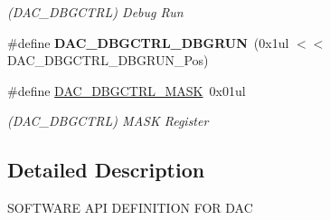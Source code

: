 \begin{DoxyCompactItemize}
\begin{DoxyCompactList}\small\item\em (D\+A\+C\+\_\+\+D\+B\+G\+C\+T\+R\+L) Debug Run \end{DoxyCompactList}\item 
\hypertarget{group___s_a_m_l21___d_a_c_gad4d5fee7dbfc084260f641e79641a97e}{}\#define {\bfseries D\+A\+C\+\_\+\+D\+B\+G\+C\+T\+R\+L\+\_\+\+D\+B\+G\+R\+U\+N}~(0x1ul $<$$<$ D\+A\+C\+\_\+\+D\+B\+G\+C\+T\+R\+L\+\_\+\+D\+B\+G\+R\+U\+N\+\_\+\+Pos)\label{group___s_a_m_l21___d_a_c_gad4d5fee7dbfc084260f641e79641a97e}

\item 
\hypertarget{group___s_a_m_l21___d_a_c_gaf587f004b2e652bebe2c8d2443acf5bd}{}\#define \hyperlink{group___s_a_m_l21___d_a_c_gaf587f004b2e652bebe2c8d2443acf5bd}{D\+A\+C\+\_\+\+D\+B\+G\+C\+T\+R\+L\+\_\+\+M\+A\+S\+K}~0x01ul\label{group___s_a_m_l21___d_a_c_gaf587f004b2e652bebe2c8d2443acf5bd}

\begin{DoxyCompactList}\small\item\em (D\+A\+C\+\_\+\+D\+B\+G\+C\+T\+R\+L) M\+A\+S\+K Register \end{DoxyCompactList}\end{DoxyCompactItemize}


\subsection{Detailed Description}
S\+O\+F\+T\+W\+A\+R\+E A\+P\+I D\+E\+F\+I\+N\+I\+T\+I\+O\+N F\+O\+R D\+A\+C 